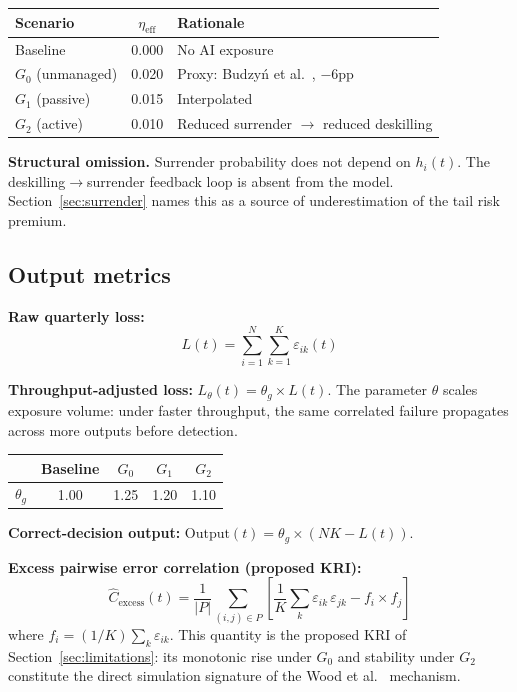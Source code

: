 \documentclass[11pt,a4paper]{article}
\begin{document}
\begin{appendices}
\begin{table}[H]
\centering\small
\setlength{\tabcolsep}{8pt}
\renewcommand{\arraystretch}{1.20}
\begin{tabular}{@{}lcl@{}}
\toprule
\textbf{Scenario} & $\eta_{\text{eff}}$ & \textbf{Rationale} \\
\midrule
Baseline            & 0.000 & No AI exposure \\
$G_0$ (unmanaged)   & 0.020 & Proxy: Budzy\'{n} et al.~\cite{budzyn_lancetgh_2025}, $-6$pp \\
$G_1$ (passive)     & 0.015 & Interpolated \\
$G_2$ (active)      & 0.010 & Reduced surrender $\to$ reduced deskilling \\
\bottomrule
\end{tabular}
\end{table}

\textbf{Structural omission.}
Surrender probability does not depend on $h_i(t)$. The
deskilling$\to$surrender feedback loop is absent from the model.
Section~\ref{sec:surrender} names this as a source of underestimation of the
tail risk premium.

\subsection{Output metrics}\label{app:model:metrics}

\textbf{Raw quarterly loss:}
\[
  L(t) = \sum_{i=1}^{N}\sum_{k=1}^{K} \varepsilon_{ik}(t)
\]

\textbf{Throughput-adjusted loss:}
$L_\theta(t) = \theta_g \times L(t)$. The parameter $\theta$ scales
exposure volume: under faster throughput, the same correlated failure
propagates across more outputs before detection.

\begin{table}[H]
\centering\small
\setlength{\tabcolsep}{10pt}
\renewcommand{\arraystretch}{1.20}
\begin{tabular}{@{}lcccc@{}}
\toprule
& Baseline & $G_0$ & $G_1$ & $G_2$ \\
\midrule
$\theta_g$ & 1.00 & 1.25 & 1.20 & 1.10 \\
\bottomrule
\end{tabular}
\end{table}

\textbf{Correct-decision output:}
$\text{Output}(t) = \theta_g \times (NK - L(t))$.

\textbf{Excess pairwise error correlation (proposed KRI):}
\[
  \hat{C}_{\text{excess}}(t)
  = \frac{1}{|P|}\sum_{(i,j)\in P}
    \left[\frac{1}{K}\sum_k \varepsilon_{ik}\,\varepsilon_{jk}
          - f_i \times f_j\right]
\]
where $f_i = (1/K)\sum_k\varepsilon_{ik}$. This quantity is the proposed KRI
of Section~\ref{sec:limitations}: its monotonic rise under $G_0$ and
stability under $G_2$ constitute the direct simulation signature of the
Wood et al.~\cite{wood_jmlr_2023} mechanism.


\end{appendices}
\end{document}
